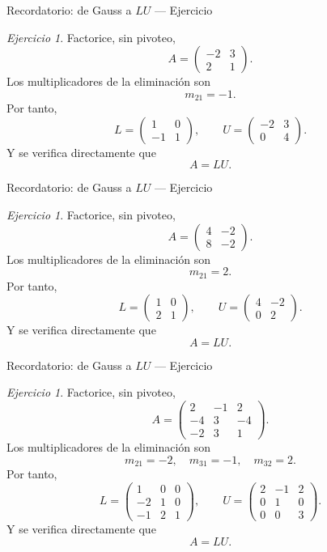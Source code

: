 \documentclass[aspectratio=169,11pt]{beamer}
\theoremstyle{remark}
\newtheorem{Ejer}[definicion]{Ejercicio}
\begin{document}
\begin{frame}[shrink=5]{Recordatorio: de Gauss a $LU$ — Ejercicio}
\footnotesize
\begin{Ejer}
Factorice, sin pivoteo,
\[
A=\begin{pmatrix}-2 & 3\\2 & 1\end{pmatrix}.
\]
Los multiplicadores de la eliminación son
\[
m_{21}=-1.
\]
Por tanto,
\[
L=\begin{pmatrix}1 & 0\\-1 & 1\end{pmatrix},\qquad U=\begin{pmatrix}-2 & 3\\0 & 4\end{pmatrix}.
\]
Y se verifica directamente que
\[
\boxed{A=LU}.
\]
\end{Ejer}
\end{frame}

\begin{frame}[shrink=5]{Recordatorio: de Gauss a $LU$ — Ejercicio}
\footnotesize
\begin{Ejer} Factorice, sin pivoteo,
\[
A=\begin{pmatrix}4 & -2\\8 & -2\end{pmatrix}.
\]
 Los multiplicadores de la eliminación son
\[
m_{21}=2.
\]
Por tanto,
\[
L=\begin{pmatrix}1 & 0\\2 & 1\end{pmatrix},\qquad U=\begin{pmatrix}4 & -2\\0 & 2\end{pmatrix}.
\]
Y se verifica directamente que
\[
\boxed{A=LU}.
\]
\end{Ejer}
\end{frame}

\begin{frame}[shrink=5]{Recordatorio: de Gauss a $LU$ — Ejercicio}
\footnotesize
\begin{Ejer}
Factorice, sin pivoteo,
\[
A=\begin{pmatrix}2 & -1 & 2\\-4 & 3 & -4\\-2 & 3 & 1\end{pmatrix}.
\]
Los multiplicadores de la eliminación son
\[
m_{21}=-2,\quad m_{31}=-1,\quad m_{32}=2.
\]
Por tanto,
\[
L=\begin{pmatrix}1 & 0 & 0\\-2 & 1 & 0\\-1 & 2 & 1\end{pmatrix},\qquad U=\begin{pmatrix}2 & -1 & 2\\0 & 1 & 0\\0 & 0 & 3\end{pmatrix}.
\]
Y se verifica directamente que
\[
\boxed{A=LU}.
\]

\end{Ejer}
\end{frame}
\end{document}
